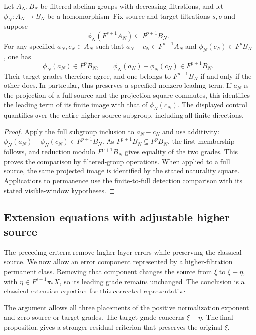 \begin{corollary}
\label{sem:ProofTools:coverage-finite-general}
Let $A_N,B_N$ be filtered abelian groups with decreasing filtrations,
and let $\phi_N:A_N\to B_N$ be a homomorphism. Fix source and target
filtrations $s,p$ and suppose
\[
 \phi_N(F^{s+1}A_N)\subseteq F^{p+1}B_N.
\]
For any specified $a_N,c_N\in A_N$ such that
$a_N-c_N\in F^{s+1}A_N$ and $\phi_N(c_N)\in F^pB_N$, one has
\[
 \phi_N(a_N)\in F^pB_N,\qquad
 \phi_N(a_N)-\phi_N(c_N)\in F^{p+1}B_N.
\]
Their target grades therefore agree, and one belongs to $F^{p+1}B_N$
if and only if the other does. In particular, this preserves a specified
nonzero leading term. If $a_N$ is the projection of a full source and
the projection square commutes, this identifies the leading term of its finite image with
that of $\phi_N(c_N)$.
The displayed control quantifies over the entire higher-source subgroup,
including all finite directions.
\end{corollary}
\begin{proof}
Apply the full subgroup inclusion to $a_N-c_N$ and use additivity:
$\phi_N(a_N)-\phi_N(c_N)\in F^{p+1}B_N$.
As $F^{p+1}B_N\subseteq F^pB_N$, the first membership follows,
and reduction modulo $F^{p+1}B_N$ gives equality of the two grades.
This proves the comparison by filtered-group operations. When applied to a full source, the same projected image is
identified by the stated naturality square. Applications to permanence use the finite-to-full detection comparison
with its stated visible-window hypotheses.
\end{proof}


\subsection{Extension equations with adjustable higher source}

The preceding criteria remove higher-layer errors while preserving the
classical source. We now allow an error component represented by a
higher-filtration permanent class. Removing that component changes the
source from $\xi$ to $\xi-\eta$, with $\eta\in F^{s+1}\pi_*X$,
so its leading grade remains unchanged. The conclusion is a classical
extension equation for this corrected representative.

The argument allows all three placements of the positive normalization
exponent and zero source or target grades. The target grade concerns
$\xi-\eta$. The final proposition gives a stronger residual criterion
that preserves the original $\xi$.

